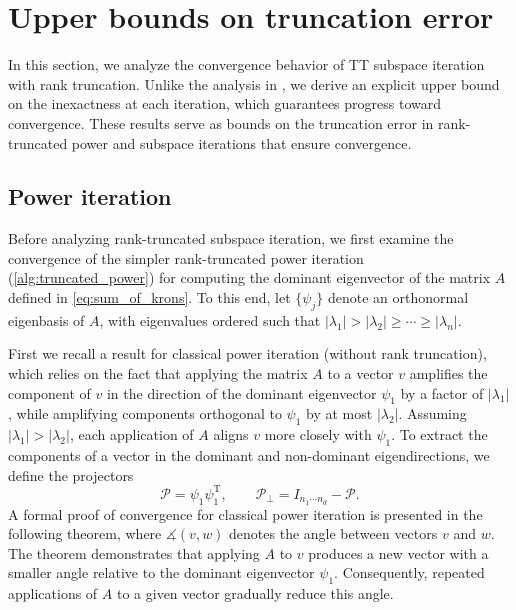 \documentclass[10pt,preprint]{elsarticle}
\renewcommand{\top}{\text{T}}
\def\P{\mathcal{P}}
\begin{document}
\section{Upper bounds on truncation error}
\label{sec:convergence}

In this section, we analyze the convergence behavior of TT subspace iteration with rank truncation. Unlike the analysis in \cite{Saad_2016}, we derive an explicit upper bound on the inexactness at each iteration, which guarantees progress toward convergence. These results serve as bounds on the truncation error in rank-truncated power and subspace iterations that ensure convergence.


\subsection{Power iteration} \label{sec:power_iter_conv}
Before analyzing rank-truncated subspace iteration, we first examine the convergence of the simpler rank-truncated power iteration (\cref{alg:truncated_power}) for computing the dominant eigenvector of the matrix $A$ defined in \eqref{eq:sum_of_krons}. To this end, let $\{\psi_j\}$ denote an orthonormal eigenbasis of $A$, with eigenvalues ordered such that $|\lambda_1| > |\lambda_2| \geq \cdots \geq |\lambda_n|$. 

First we recall a result for classical power iteration (without rank truncation), which relies on the fact that applying the matrix $A$ to a vector $v$ amplifies the component of $v$ in the direction of the dominant eigenvector $\psi_1$ by a factor of $|\lambda_1|$, while amplifying components orthogonal to $\psi_1$ by at most $|\lambda_2|$. Assuming $|\lambda_1|>|\lambda_2|$, each application of $A$ aligns $v$ more closely with $\psi_1$. To extract the components of a vector in the dominant and non-dominant eigendirections, we define the projectors 
\begin{equation} \label{eq:projectors_1}
    \P = \psi_1 \psi_1^{\top}, \qquad \P_{\perp} = I_{n_1 \cdots n_d} - \P.
\end{equation}  
A formal proof of convergence for classical power iteration is presented in the following theorem, where $\measuredangle(v, w)$ denotes the angle between vectors $v$ and $w$. The theorem demonstrates that applying $A$ to $v$ produces a new vector with a smaller angle relative to the dominant eigenvector $\psi_1$. Consequently, repeated applications of $A$ to a given vector gradually reduce this angle. 
\end{document}
